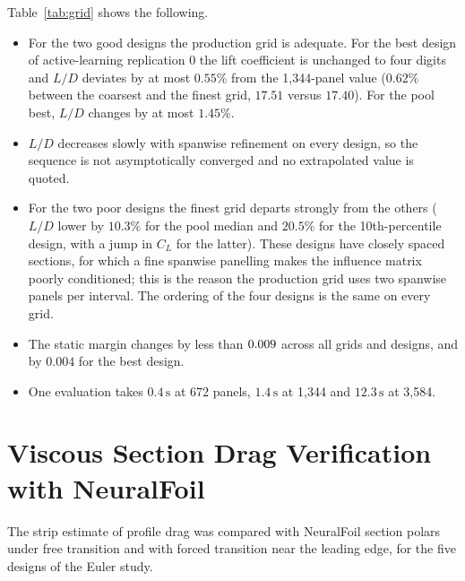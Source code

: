 Table~\ref{tab:grid} shows the following.
\begin{itemize}
    \item For the two good designs the production grid is adequate. For the best design of active-learning replication 0 the lift coefficient is unchanged to four digits and $L/D$ deviates by at most $0.55\%$ from the 1{,}344-panel value ($0.62\%$ between the coarsest and the finest grid, $17.51$ versus $17.40$). For the pool best, $L/D$ changes by at most $1.45\%$.
    \item $L/D$ decreases slowly with spanwise refinement on every design, so the sequence is not asymptotically converged and no extrapolated value is quoted.
    \item For the two poor designs the finest grid departs strongly from the others ($L/D$ lower by $10.3\%$ for the pool median and $20.5\%$ for the 10th-percentile design, with a jump in $C_L$ for the latter). These designs have closely spaced sections, for which a fine spanwise panelling makes the influence matrix poorly conditioned; this is the reason the production grid uses two spanwise panels per interval. The ordering of the four designs is the same on every grid.
    \item The static margin changes by less than $0.009$ across all grids and designs, and by $0.004$ for the best design.
    \item One evaluation takes $0.4\,\mathrm{s}$ at 672 panels, $1.4\,\mathrm{s}$ at 1{,}344 and $12.3\,\mathrm{s}$ at 3{,}584.
\end{itemize}



\section{Viscous Section Drag Verification with NeuralFoil}
\label{sec:neuralfoil_audit}
The strip estimate of profile drag was compared with NeuralFoil section polars under free transition and with forced transition near the leading edge, for the five designs of the Euler study.

\begin{table}[htbp]
\centering\small
\caption{Viscous profile drag comparison between Raymer empirical strip theory and NeuralFoil ($e^N$ free transition vs.\ fully turbulent) across five configurations.}
\label{tab:visc}
\resizebox{\linewidth}{!}{%

}
\end{table}

